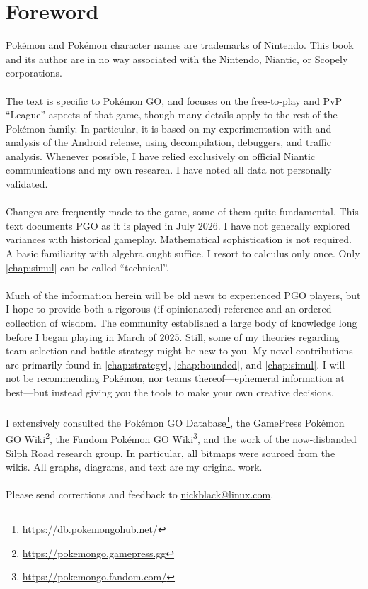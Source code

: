 \clearpage
\chapter{Foreword}

\noindent{}Pokémon and Pokémon character names are trademarks of Nintendo.
This book and its author are in no way associated with the Nintendo, Niantic,
  or Scopely corporations.\\
\\
\noindent{}The text is specific to Pokémon GO, and focuses on the free-to-play and PvP
  ``League'' aspects of that game, though many details
  apply to the rest of the Pokémon family.
In particular, it is based on my experimentation with and analysis of
 the Android release, using decompilation, debuggers, and traffic analysis.
Whenever possible, I have relied exclusively on official Niantic communications
 and my own research.
I have noted all data not personally validated.\\
\\
\noindent{}Changes are frequently made to the game, some of them quite fundamental.
This text documents PGO as it is played in July 2026.
I have not generally explored variances with historical gameplay.
Mathematical sophistication is not required.
A basic familiarity with algebra ought suffice.
I resort to calculus only once.
Only \autoref{chap:simul} can be called ``technical''.\\
\\
\noindent{}Much of the information herein will be old news to experienced
 PGO players, but I hope to provide both a rigorous (if opinionated) reference and an ordered collection of wisdom.
The community established a large body of knowledge long before I
 began playing in March of 2025.
Still, some of my theories regarding team selection and battle strategy might
  be new to you.
My novel contributions are primarily found in \autoref{chap:strategy},
  \autoref{chap:bounded}, and \autoref{chap:simul}.
I will not be recommending Pokémon, nor teams thereof---ephemeral information at best---but
 instead giving you the tools to make your own creative decisions.\\
\\
\noindent{}I extensively consulted the Pokémon GO Database\footnote{\url{https://db.pokemongohub.net/}},
  the GamePress Pokémon GO Wiki\footnote{\url{https://pokemongo.gamepress.gg}},
  the Fandom Pokémon GO Wiki\footnote{\url{https://pokemongo.fandom.com/}},
  and the work of the now-disbanded Silph Road research group.
In particular, all bitmaps were sourced from the wikis.
All graphs, diagrams, and text are my original work.\\
\\
\noindent{}Please send corrections and feedback to 
  \href{mailto:nickblack@linux.com}{nickblack@linux.com}.

